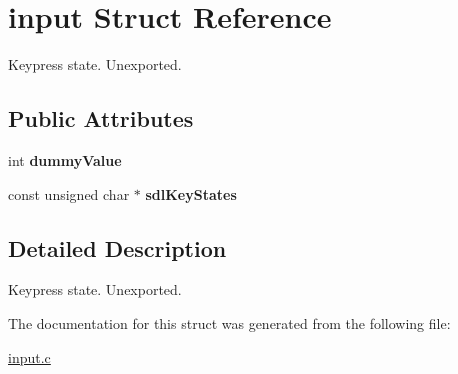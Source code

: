 \hypertarget{structinput}{}\section{input Struct Reference}
\label{structinput}


Keypress state. Unexported.  


\subsection*{Public Attributes}
\begin{DoxyCompactItemize}
\item 
\mbox{\label{structinput_a7a97a269d355fcf00fb3983cd32d4443}} 
int {\bfseries dummy\+Value}
\item 
\mbox{\label{structinput_ab5002ba64b4c7887b55455f4df8a5799}} 
const unsigned char $\ast$ {\bfseries sdl\+Key\+States}
\end{DoxyCompactItemize}


\subsection{Detailed Description}
Keypress state. Unexported. 

The documentation for this struct was generated from the following file\+:\begin{DoxyCompactItemize}
\item 
\hyperlink{input_8c}{input.\+c}\end{DoxyCompactItemize}
